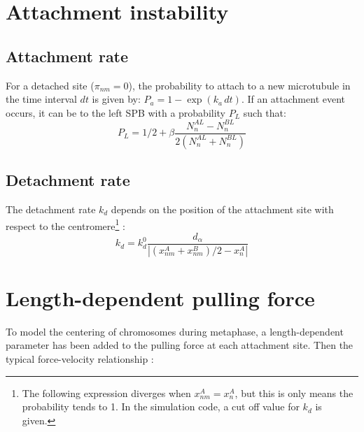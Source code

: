 \documentclass[a4paper,12pt]{article}
\begin{document}
\newpage
\section{Attachment instability}

\subsection{Attachment rate}

For a detached site ($\pi_{nm} = 0$), the probability to attach to a
new microtubule in the time interval $dt$ is given by: $P_a = 1 -
\exp(k_a\,dt)$. If an attachment event occurs, it can be to the left
SPB with a probability $P_L$ such that:
\begin{equation}
  \label{eq:p_left}
  P_L =  1/2 + \beta \frac{N_n^{AL} - N_n^{BL}}{2(N_n^{AL} + N_n^{BL})}
\end{equation}

\subsection{Detachment rate}

The detachment rate $k_d$ depends on the position of the attachment
site with respect to the centromere\footnote{The following expression
  diverges when $ x_{nm}^A = x_n^A $, but this is only means the
  probability tends to 1. In the simulation code, a cut off value for
  $k_d$ is given.} :
\begin{equation}
  \label{eq:k_det}
  k_d = k_d^0 \frac{d_\alpha}{|(x_{nm}^A + x_{nm}^B)/2 - x_n^A|}
\end{equation}


\section{Length-dependent pulling force}

To model the centering of chromosomes during metaphase, a length-dependent parameter has been added to the pulling force at each attachment site. Then the typical force-velocity relationship :
\end{document}
